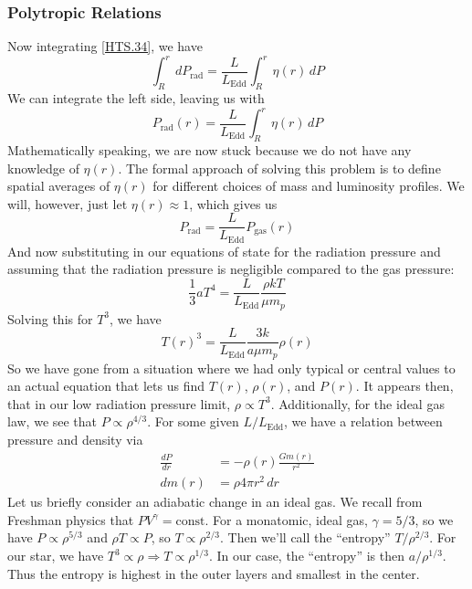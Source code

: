 \documentclass[10pt]{article}
\numberwithin{equation}{section}
\begin{document}
	\subsubsection{Polytropic Relations}
	Now integrating \eqref{HTS.34}, we have
	\begin{equation}
		\label{HTS.35} \int_R^rdP_{\mathrm{rad}}=\frac{L}{L_{\mathrm{Edd}}}\int_R^r\eta(r)\,dP
	\end{equation}
	We can integrate the left side, leaving us with
	\begin{equation}
		\label{HTS.36} P_{\mathrm{rad}}(r)=\frac{L}{L_{\mathrm{Edd}}}\int_R^r\eta(r)\,dP
	\end{equation}
	Mathematically speaking, we are now stuck because we do not have any knowledge of $\eta(r)$. The formal approach of solving this problem is to define spatial averages of $\eta(r)$ for different choices of mass and luminosity profiles. We will, however, just let $\eta(r)\approx 1$, which gives us
	\begin{equation}
		\label{HTS.37} P_{\mathrm{rad}}=\frac{L}{L_{\mathrm{Edd}}}P_{\mathrm{gas}}(r)
	\end{equation}
	And now substituting in our equations of state for the radiation pressure and assuming that the radiation pressure is negligible compared to the gas pressure:
	\begin{equation}
		\label{HTS.38} \frac{1}{3}aT^4=\frac{L}{L_{\mathrm{Edd}}}\frac{\rho kT}{\mu m_p}
	\end{equation}
	Solving this for $T^3$, we have
	\begin{equation}
		\label{HTS.39} \boxed{T(r)^3=\frac{L}{L_{\mathrm{Edd}}}\frac{3k}{a\mu m_p}\rho(r)}
	\end{equation}
	So we have gone from a situation where we had only typical or central values to an actual equation that lets us find $T(r)$, $\rho(r)$, and $P(r)$. It appears then, that in our low radiation pressure limit, $\rho\propto T^3$. Additionally, for the ideal gas law, we see that $P\propto \rho^{4/3}$. For some given $L/L_{\mathrm{Edd}}$, we have a relation between pressure and density via
	\begin{align}
		\label{HTS.40} \frac{dP}{dr}&=-\rho(r)\frac{Gm(r)}{r^2}\\
		\label{HTS.41} dm(r) &= \rho 4\pi r^2\,dr
	\end{align}
	Let us briefly consider an adiabatic change in an ideal gas. We recall from Freshman physics that $PV^\gamma=\mathrm{const}$. For a monatomic, ideal gas, $\gamma=5/3$, so we have $P\propto \rho^{5/3}$ and $\rho T\propto P$, so $T\propto \rho^{2/3}$. Then we'll call the ``entropy'' $T/\rho^{2/3}$. For our star, we have $T^3\propto \rho\Rightarrow T\propto \rho^{1/3}$. In our case, the ``entropy'' is then $a/\rho^{1/3}$. Thus the entropy is highest in the outer layers and smallest in the center.
\end{document}

